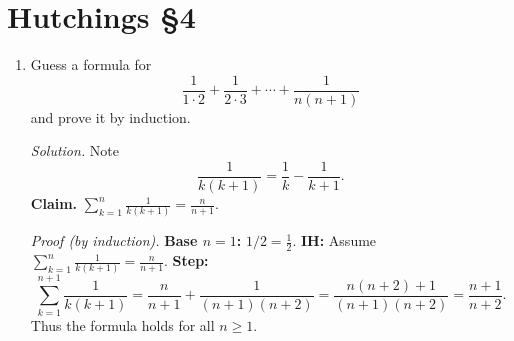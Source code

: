 \documentclass[11pt]{article}
\newcommand{\ds}{\displaystyle}
\begin{document}
\bigskip
\section*{Hutchings §4}

\begin{enumerate}[label=\textbf{\arabic*.},resume]

\item Guess a formula for
\[
\frac{1}{1\cdot 2}+\frac{1}{2\cdot 3}+\cdots+\frac{1}{n(n+1)}
\]
and prove it by induction.

\textit{Solution.} Note
\[
\frac{1}{k(k+1)}=\frac{1}{k}-\frac{1}{k+1}.
\]
\textbf{Claim.} $\ds \sum_{k=1}^n \frac{1}{k(k+1)}=\frac{n}{n+1}$.

\textit{Proof (by induction).}
\textbf{Base $n=1$:} $1/2=\frac{1}{2}$.  
\textbf{IH:} Assume $\sum_{k=1}^n \frac{1}{k(k+1)}=\frac{n}{n+1}$.  
\textbf{Step:}
\[
\sum_{k=1}^{n+1}\frac{1}{k(k+1)}
=\frac{n}{n+1}+\frac{1}{(n+1)(n+2)}
=\frac{n(n+2)+1}{(n+1)(n+2)}
=\frac{n+1}{n+2}.
\]
Thus the formula holds for all $n\ge1$. 

\end{enumerate}
\end{document}
